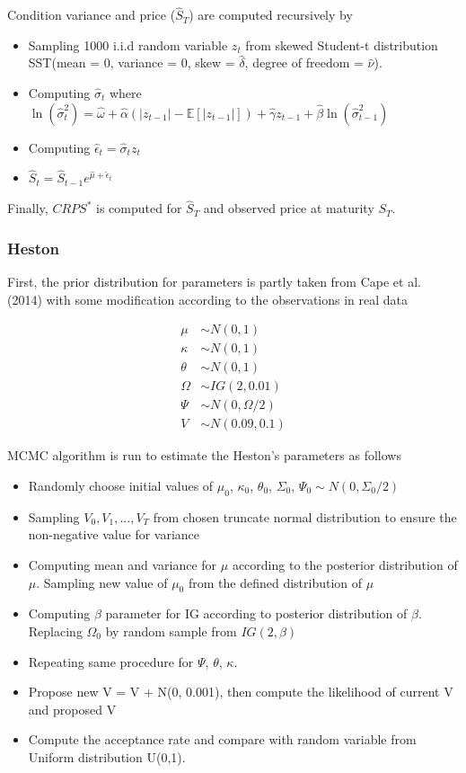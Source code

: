\documentclass[12pt,a4paper]{article}
\numberwithin{equation}{section}
\begin{document}
Condition variance and price ($\hat{S}_T$) are computed recursively by 

\begin{itemize}
\item Sampling 1000 i.i.d random variable $z_t$ from skewed Student-t distribution SST(mean = 0, variance = 0, skew = $\hat{\delta}$, degree of freedom = $\hat{\nu}$).
\item Computing $\hat{\sigma}_t$ where $ \ln\left(\hat{\sigma}_t^2\right) = \hat{\omega} + \hat{\alpha} \left( |z_{t-1}| - \mathbb{E}[|z_{t-1}|] \right) + \hat{\gamma} z_{t-1} +  \hat{\beta} \ln\left(\hat{\sigma}_{t-1}^2\right)$
\item Computing $\hat{\epsilon}_t = \hat{\sigma}_t z_t $
\item $\hat{S}_t = \hat{S}_{t-1} e^{\hat{\mu} + \hat{\epsilon}_t}$
\end{itemize}

Finally, $CRPS^*$ is computed for $\hat{S}_T$ and observed price at maturity $S_T$.

\subsubsection{Heston}

First, the prior distribution for parameters is partly taken from Cape et al. (2014) with some modification according to the observations in real data

\begin{align*}
\mu &\sim N(0,1) \\
\kappa &\sim N(0,1) \\
\theta &\sim N(0,1) \\
\Omega &\sim IG(2, 0.01) \\
\Psi &\sim N(0, \Omega/2) \\
V &\sim N(0.09, 0.1) 
\end{align*}

MCMC algorithm is run to estimate the Heston's parameters as follows

\begin{itemize}
\item Randomly choose initial values of $\mu_0$, $\kappa_0$, $\theta_0$, $\Sigma_0$, $\Psi_0 \sim N(0, \Sigma_0/2)$
\item Sampling $V_0, V_1, ..., V_T$ from chosen truncate normal distribution to ensure the non-negative value for variance 
\item Computing mean and variance for $\mu$ according to the posterior distribution of $\mu$. Sampling new value of $\mu_0$ from the defined distribution of $\mu$
\item Computing $\beta$ parameter for IG according to posterior distribution of $\beta$. Replacing $\Omega_0$ by random sample from $IG(2, \beta)$
\item Repeating same procedure for $\Psi$, $\theta$, $\kappa$.
\item Propose new V = V + N(0, 0.001), then compute the likelihood of current V and proposed V
\item Compute the acceptance rate and compare with random variable from Uniform distribution U(0,1).
\end{itemize}
\end{document}
